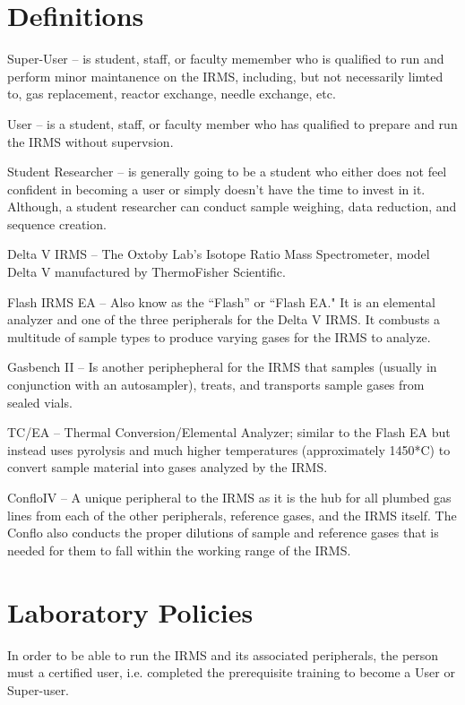 \documentclass[12pt]{../SOP3_beta}\usepackage[]{graphicx}\usepackage[]{color}
\begin{document}
\section{Definitions}

\NP Super-User -- is student, staff, or faculty memember who is qualified to run and perform minor maintanence on the IRMS, including, but not necessarily limted to, gas replacement, reactor exchange, needle exchange, etc.  

\NP User -- is a student, staff, or faculty member who has qualified to prepare and run the IRMS without supervsion.

\NP Student Researcher -- is generally going to be a student who either does not feel confident in becoming a user or simply doesn't have the time to invest in it. Although, a student researcher can conduct sample weighing, data reduction, and sequence creation.

\NP Delta V IRMS -- The Oxtoby Lab's Isotope Ratio Mass Spectrometer, model Delta V manufactured by ThermoFisher Scientific. 

\NP Flash IRMS EA -- Also know as the ``Flash'' or ``Flash EA." It is an elemental analyzer and one of the three peripherals for the Delta V IRMS. It combusts a multitude of sample types to produce varying gases for the IRMS to analyze. 

\NP Gasbench II -- Is another periphepheral for the IRMS that samples (usually in conjunction with an autosampler), treats, and transports sample gases from sealed vials.

\NP TC/EA -- Thermal Conversion/Elemental Analyzer; similar to the Flash EA but instead uses pyrolysis and much higher temperatures (approximately 1450*C) to convert sample material into gases analyzed by the IRMS.

\NP ConfloIV -- A unique peripheral to the IRMS as it is the hub for all plumbed gas lines from each of the other peripherals, reference gases, and the IRMS itself. The Conflo also conducts the proper dilutions of sample and reference gases that is needed for them to fall within the working range of the IRMS.

\section{Laboratory Policies}

\NP In order to be able to run the IRMS and its associated peripherals, the person must a certified user, i.e. completed the prerequisite training to become a User or Super-user. 
\end{document}
